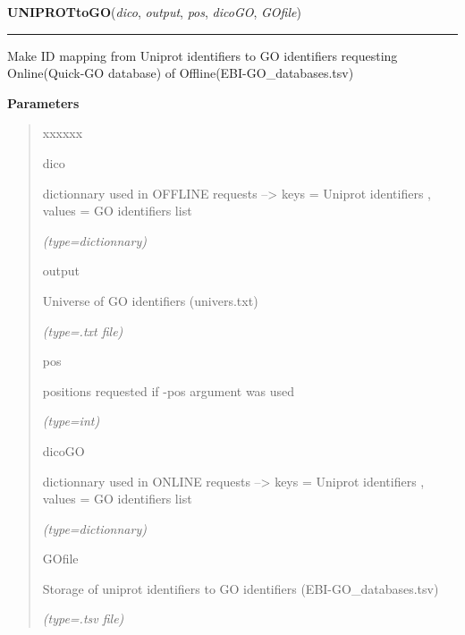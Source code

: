 \hspace{.8\funcindent}\begin{boxedminipage}{\funcwidth}

    \raggedright \textbf{UNIPROTtoGO}(\textit{dico}, \textit{output}, \textit{pos}, \textit{dicoGO}, \textit{GOfile})

    \vspace{-1.5ex}

    \rule{\textwidth}{0.5\fboxrule}
\setlength{\parskip}{2ex}
    Make ID mapping from Uniprot identifiers to GO identifiers requesting 
    Online(Quick-GO database) of Offline(EBI-GO\_databases.tsv)

\setlength{\parskip}{1ex}
      \textbf{Parameters}
      \vspace{-1ex}

      \begin{quote}
        \begin{Ventry}{xxxxxx}

          \item[dico]

          dictionnary used in OFFLINE requests --{\textgreater} keys = 
          Uniprot identifiers , values = GO identifiers list

            {\it (type=dictionnary)}

          \item[output]

          Universe of GO identifiers (univers.txt)

            {\it (type=.txt file)}

          \item[pos]

          positions requested if -pos argument was used

            {\it (type=int)}

          \item[dicoGO]

          dictionnary used in ONLINE requests --{\textgreater} keys = 
          Uniprot identifiers , values = GO identifiers list

            {\it (type=dictionnary)}

          \item[GOfile]

          Storage of uniprot identifiers to GO identifiers 
          (EBI-GO\_databases.tsv)

            {\it (type=.tsv file)}

        \end{Ventry}

      \end{quote}

    \end{boxedminipage}


